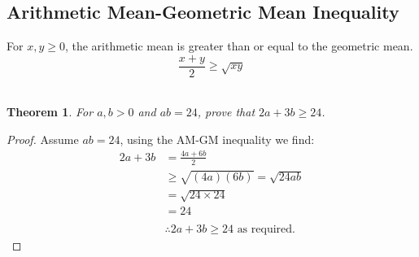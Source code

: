 \documentclass[a4paper,twoside,10pt]{article}
\newenvironment{example}[1]{%
	\mbox{}\\\tcolorbox[beamer,breakable,%
		title=Example: #1,standard jigsaw,opacityback=0, colframe=blue!75!black, boxrule=2pt]}{\endtcolorbox\mbox{}\\}
\newtheorem*{theorem*}{Theorem}
\begin{document}
		\subsection{Arithmetic Mean-Geometric Mean Inequality}
			For $x,y\geq0$, the arithmetic mean is greater than or equal to the geometric mean.
			\[
				\frac{x+y}{2}\geq\sqrt{xy}
			\]
			\begin{example}{AM-GM Inequality}
				\begin{theorem*}
					For $a,b>0$ and $ab=24$, prove that $2a+3b\geq24$.
				\end{theorem*}
				\begin{proof}
					Assume $ab=24$, using the AM-GM inequality we find:\\
					\begin{align*}
						2a+3b&=\frac{4a+6b}{2}\\
						&\geq\sqrt{(4a)(6b)}=\sqrt{24ab}\\
						&=\sqrt{24\times24}\\
						&=24\\
						\\
						&\therefore 2a+3b\geq24\text{ as required.}
					\end{align*}
				\end{proof}
			\end{example}
\end{document}
